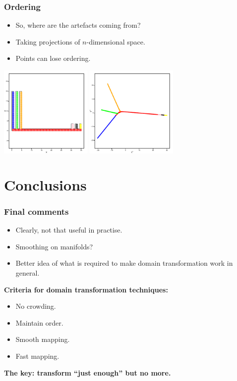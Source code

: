 \documentclass[ignorenonframetext]{beamer} %
\newcommand{\bc}{\begin{center}}
\newcommand{\ec}{\end{center}}
\newcommand{\bi}{\begin{itemize}}
\newcommand{\ei}{\end{itemize}}
\begin{document}
\begin{frame}
	\frametitle{Ordering}
	\bi
		\item So, where are the artefacts coming from?
		\item Taking projections of $n$-dimensional space.
		\item Points can lose ordering.
	\ei
	\centering
              \includegraphics[height=1.75in]{figs/comb.pdf} \includegraphics[height=1.75in]{figs/comb-2d.pdf}
\end{frame}

\section{Conclusions}

\begin{frame}
	\frametitle{Final comments}
		\bi
			\item Clearly, not that useful in practise.
			\item Smoothing on manifolds?
			\item Better idea of what is required to make domain transformation work in general.
		\ei
		\textbf{Criteria for domain transformation techniques:}
          \bi
            \item No crowding.
            \item Maintain order.
            \item Smooth mapping.
            \item Fast mapping.
           \ei
         \bc \textbf{The key: transform ``just enough'' but no more.} \ec
\end{frame}
\end{document}
